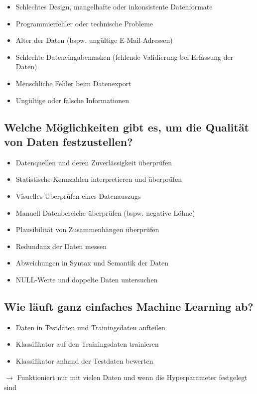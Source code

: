 \documentclass[a4paper]{article}
\begin{document}
		\begin{itemize}
			\item Schlechtes Design, mangelhafte oder inkonsistente Datenformate
			\item Programmierfehler oder technische Probleme
			\item Alter der Daten (bspw. ungültige E-Mail-Adressen)
			\item Schlechte Dateneingabemasken (fehlende Validierung bei Erfassung der Daten)
			\item Menschliche Fehler beim Datenexport
			\item Ungültige oder falsche Informationen
		\end{itemize}
	
		\subsection{Welche Möglichkeiten gibt es, um die Qualität von Daten festzustellen?}
		
		\begin{itemize}
			\item Datenquellen und deren Zuverlässigkeit überprüfen
			\item Statistische Kennzahlen interpretieren und überprüfen
			\item Visuelles Überprüfen eines Datenauszugs
			\item Manuell Datenbereiche überprüfen (bspw. negative Löhne)
			\item Plausibilität von Zusammenhängen überprüfen
			\item Redundanz der Daten messen
			\item Abweichungen in Syntax und Semantik der Daten
			\item NULL-Werte und doppelte Daten untersuchen
		\end{itemize}
		
		\subsection{Wie läuft ganz einfaches Machine Learning ab?}
		
		\begin{itemize}
			\item Daten in Testdaten und Trainingsdaten aufteilen
			\item Klassifikator auf den Trainingsdaten trainieren
			\item Klassifikator anhand der Testdaten bewerten
		\end{itemize}
		$\rightarrow$ Funktioniert nur mit vielen Daten und wenn die Hyperparameter festgelegt sind
		
\end{document}
